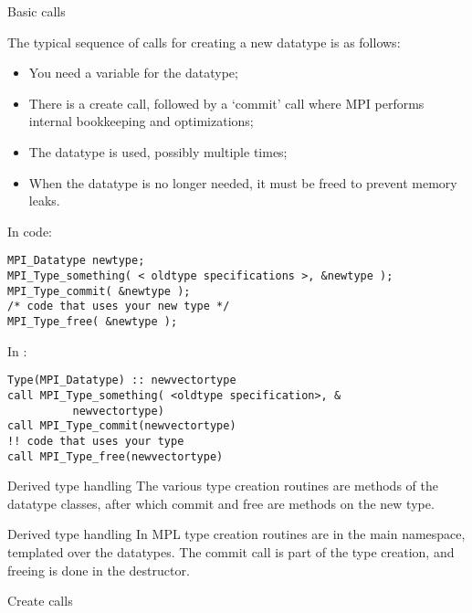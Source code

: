  {Basic calls}
\label{sec:data-commit}

The typical sequence of calls for creating a new datatype is as follows:
\begin{itemize}
\item You need a variable for the datatype;
\item There is a create call, followed by a `commit' call where MPI
  performs internal bookkeeping and optimizations;
\item The datatype is used, possibly multiple times;
\item When the datatype is no longer needed, it must be freed to prevent memory leaks.
\end{itemize}
In code:
\begin{lstlisting}
MPI_Datatype newtype;
MPI_Type_something( < oldtype specifications >, &newtype );
MPI_Type_commit( &newtype );
/* code that uses your new type */
MPI_Type_free( &newtype );
\end{lstlisting}

In :
\lstset{language=Fortran}
\begin{lstlisting}
Type(MPI_Datatype) :: newvectortype
call MPI_Type_something( <oldtype specification>, &
          newvectortype)
call MPI_Type_commit(newvectortype)
!! code that uses your type
call MPI_Type_free(newvectortype)
\end{lstlisting}
\lstset{language=C}

\begin{pythonnote}{Derived type handling}
  The various type creation routines are methods
  of the datatype classes, after which commit and free are
  methods on the new type.
\end{pythonnote}

\begin{mplnote}{Derived type handling}
  \label{mpl:derived}
  In \ac{MPL} type creation routines are in the main namespace,
  templated over the datatypes.
  The commit call is part of the type creation,
  and freeing is done in the destructor.
\end{mplnote}

 {Create calls}

